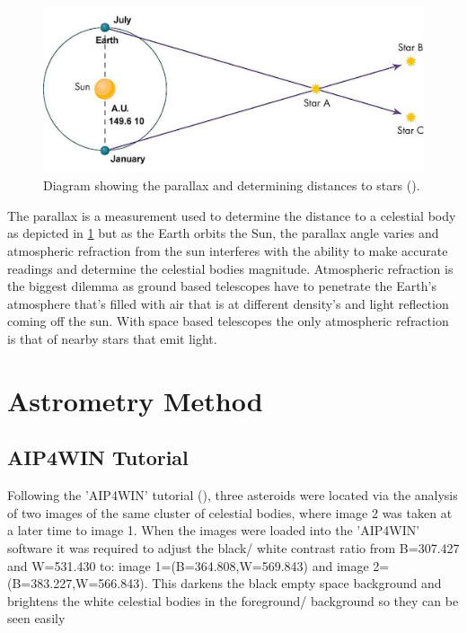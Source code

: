\documentclass[12pt]{article}
\begin{document}
\begin{figure}[H]
\centering
\includegraphics[scale=0.6]{Images/S1/parallax.png}
\caption{Diagram showing the parallax and determining distances to stars (\cite{parallax}).}
\label{parallax}
\end{figure}

The parallax is a measurement used to determine the distance to a celestial body as depicted in \cref{parallax} but as the Earth orbits the Sun, the parallax angle varies and atmospheric refraction from the sun interferes with the ability to make accurate readings and determine the celestial bodies magnitude. Atmospheric refraction is the biggest dilemma as ground based telescopes have to penetrate the Earth's atmosphere that's filled with air that is at different density's and light reflection coming off the sun. With space based telescopes the only atmospheric refraction is that of nearby stars that emit light. 

\section{Astrometry Method}
\label{Section 2}
\subsection{AIP4WIN Tutorial}
\label{Subsection 2a}

Following the 'AIP4WIN' tutorial (\cite{ImageProcessingTutorial}), three asteroids were located via the analysis of two images of the same cluster of celestial bodies, where image 2 was taken at a later time to image 1. When the images were loaded into the 'AIP4WIN' software it was required to adjust the black/ white contrast ratio from B=307.427 and W=531.430 to: image 1=(B=364.808,W=569.843) and image 2=(B=383.227,W=566.843). This darkens the black empty space background and brightens the white celestial bodies in the foreground/ background so they can be seen easily 
\end{document}

